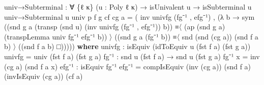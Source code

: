 \documentclass[
  11pt,
  oneside,
  article]{memoir}
\newenvironment{Shaded}{}{}
\newcommand{\KeywordTok}[1]{\textcolor[rgb]{0.00,0.44,0.13}{\textbf{#1}}}
\newcommand{\NormalTok}[1]{#1}
\newcommand{\OtherTok}[1]{\textcolor[rgb]{0.00,0.44,0.13}{#1}}
\theoremstyle{definition}
\theoremstyle{plain}
\newcommand{\0}{\textsf{0}}
\newcommand{\1}{\tn{\textsf{1}}}
\begin{document}
\begin{Shaded}
\begin{Highlighting}[]
\NormalTok{univ→Subterminal }\OtherTok{:} \OtherTok{∀} \OtherTok{\{}\NormalTok{ℓ κ}\OtherTok{\}} \OtherTok{(}\NormalTok{u }\OtherTok{:}\NormalTok{ Poly ℓ κ}\OtherTok{)}
                   \OtherTok{→}\NormalTok{ isUnivalent u}
                   \OtherTok{→}\NormalTok{ isSubterminal u}
\NormalTok{univ→Subterminal u univ p f g cf cg a }\OtherTok{=} 
    \OtherTok{(}\NormalTok{ inv univfg }\OtherTok{(}\NormalTok{fg⁻¹ , efg⁻¹}\OtherTok{)} 
\NormalTok{    , }\OtherTok{(λ}\NormalTok{ b }\OtherTok{→}\NormalTok{ sym }\OtherTok{((}\NormalTok{snd g a }\OtherTok{(}\NormalTok{transp }\OtherTok{(}\NormalTok{snd u}\OtherTok{)}  \OtherTok{(}\NormalTok{inv univfg }\OtherTok{(}\NormalTok{fg⁻¹ , efg⁻¹}\OtherTok{))}\NormalTok{ b}\OtherTok{))} 
\NormalTok{                  ≡〈 }\OtherTok{(}\NormalTok{ap }\OtherTok{(}\NormalTok{snd g a}\OtherTok{)} \OtherTok{(}\NormalTok{transpLemma univ fg⁻¹ efg⁻¹ b}\OtherTok{))}\NormalTok{ 〉 }
                  \OtherTok{((}\NormalTok{snd g a }\OtherTok{(}\NormalTok{fg⁻¹ b}\OtherTok{))} 
\NormalTok{                  ≡〈 snd }\OtherTok{(}\NormalTok{snd }\OtherTok{(}\NormalTok{cg a}\OtherTok{))} \OtherTok{(}\NormalTok{snd f a b}\OtherTok{)}\NormalTok{ 〉 }
                  \OtherTok{((}\NormalTok{snd f a b}\OtherTok{)}\NormalTok{ □}\OtherTok{)))))}
    \KeywordTok{where}\NormalTok{ univfg }\OtherTok{:}\NormalTok{ isEquiv }\OtherTok{(}\NormalTok{idToEquiv u }\OtherTok{(}\NormalTok{fst f a}\OtherTok{)} \OtherTok{(}\NormalTok{fst g a}\OtherTok{))}
\NormalTok{          univfg }\OtherTok{=}\NormalTok{ univ }\OtherTok{(}\NormalTok{fst f a}\OtherTok{)} \OtherTok{(}\NormalTok{fst g a}\OtherTok{)}
\NormalTok{          fg⁻¹ }\OtherTok{:}\NormalTok{ snd u }\OtherTok{(}\NormalTok{fst f a}\OtherTok{)} \OtherTok{→}\NormalTok{ snd u }\OtherTok{(}\NormalTok{fst g a}\OtherTok{)}
\NormalTok{          fg⁻¹ x }\OtherTok{=}\NormalTok{ inv }\OtherTok{(}\NormalTok{cg a}\OtherTok{)} \OtherTok{(}\NormalTok{snd f a x}\OtherTok{)}
\NormalTok{          efg⁻¹ }\OtherTok{:}\NormalTok{ isEquiv fg⁻¹}
\NormalTok{          efg⁻¹ }\OtherTok{=}\NormalTok{ compIsEquiv }\OtherTok{(}\NormalTok{inv }\OtherTok{(}\NormalTok{cg a}\OtherTok{))} \OtherTok{(}\NormalTok{snd f a}\OtherTok{)} 
                              \OtherTok{(}\NormalTok{invIsEquiv }\OtherTok{(}\NormalTok{cg a}\OtherTok{))} \OtherTok{(}\NormalTok{cf a}\OtherTok{)}
\end{Highlighting}
\end{Shaded}
\end{document}
